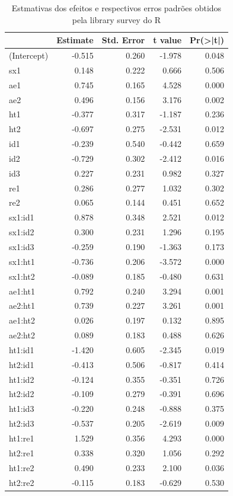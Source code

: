 \documentclass[]{book}
\theoremstyle{definition}
\theoremstyle{definition}
\theoremstyle{definition}
\theoremstyle{remark}
\begin{document}
\begin{table}

\caption{\label{tab:logit}Estmativas dos efeitos e respectivos erros padrões obtidos pela library survey do R}
\centering
\begin{tabular}[t]{lrrrr}
\toprule
  & Estimate & Std. Error & t value & Pr(>|t|)\\
\midrule
(Intercept) & -0.515 & 0.260 & -1.978 & 0.048\\
sx1 & 0.148 & 0.222 & 0.666 & 0.506\\
ae1 & 0.745 & 0.165 & 4.528 & 0.000\\
ae2 & 0.496 & 0.156 & 3.176 & 0.002\\
ht1 & -0.377 & 0.317 & -1.187 & 0.236\\
\addlinespace
ht2 & -0.697 & 0.275 & -2.531 & 0.012\\
id1 & -0.239 & 0.540 & -0.442 & 0.659\\
id2 & -0.729 & 0.302 & -2.412 & 0.016\\
id3 & 0.227 & 0.231 & 0.982 & 0.327\\
re1 & 0.286 & 0.277 & 1.032 & 0.302\\
\addlinespace
re2 & 0.065 & 0.144 & 0.451 & 0.652\\
sx1:id1 & 0.878 & 0.348 & 2.521 & 0.012\\
sx1:id2 & 0.300 & 0.231 & 1.296 & 0.195\\
sx1:id3 & -0.259 & 0.190 & -1.363 & 0.173\\
sx1:ht1 & -0.736 & 0.206 & -3.572 & 0.000\\
\addlinespace
sx1:ht2 & -0.089 & 0.185 & -0.480 & 0.631\\
ae1:ht1 & 0.792 & 0.240 & 3.294 & 0.001\\
ae2:ht1 & 0.739 & 0.227 & 3.261 & 0.001\\
ae1:ht2 & 0.026 & 0.197 & 0.132 & 0.895\\
ae2:ht2 & 0.089 & 0.183 & 0.488 & 0.626\\
\addlinespace
ht1:id1 & -1.420 & 0.605 & -2.345 & 0.019\\
ht2:id1 & -0.413 & 0.506 & -0.817 & 0.414\\
ht1:id2 & -0.124 & 0.355 & -0.351 & 0.726\\
ht2:id2 & -0.109 & 0.279 & -0.391 & 0.696\\
ht1:id3 & -0.220 & 0.248 & -0.888 & 0.375\\
\addlinespace
ht2:id3 & -0.537 & 0.205 & -2.619 & 0.009\\
ht1:re1 & 1.529 & 0.356 & 4.293 & 0.000\\
ht2:re1 & 0.338 & 0.320 & 1.056 & 0.292\\
ht1:re2 & 0.490 & 0.233 & 2.100 & 0.036\\
ht2:re2 & -0.115 & 0.183 & -0.629 & 0.530\\
\bottomrule
\end{tabular}
\end{table}
\end{document}
